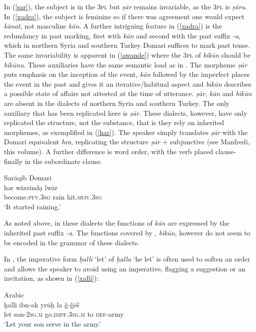 \documentclass[output=paper]{langsci/langscibook}
\begin{document}
In (\ref{sar}), the subject is in the 3\textsc{pl} but \textit{ṣār} remains invariable, as the \textsc{3pl} is \textit{ṣāru}. In (\ref{xadra}), the subject is feminine so if there was {agreement} one would expect \textit{kānat}, not masculine \textit{kān}. A further intriguing feature in (\ref{xadra}) is the redundancy in past marking, first with \textit{kān} and second with the past suffix \textit{{}-a}, which in northern Syria and southern Turkey Domari suffices to mark past {tense}. The same invariability is apparent in (\ref{awande}) where the \textsc{3pl} of \textit{bikūn} should be \textit{bikūnu}. These auxiliaries have the same semantic load as in . The morpheme \textit{ṣār} puts {emphasis} on the inception of the event, \textit{kān} followed by the imperfect places the event in the past and gives it an iterative/habitual aspect and \textit{bikūn} describes a possible state of affairs not attested at the time of utterance.  \textit{ṣār}, \textit{kān} and \textit{bikūn} are absent in the dialects of northern Syria and southern Turkey. The only auxiliary that has been replicated here is \textit{ṣār}. These dialects, however, have only replicated the structure, not the substance, that is they rely on inherited morphemes, as exemplified in (\ref{har}). The speaker simply translates  \textit{ṣār} with the Domari equivalent \textit{hra}, replicating the  structure \textit{ṣār} + subjunctive (see Manfredi, this volume). A further difference is {word order}, with the verb placed clause-finally in the subordinate clause. 

\ea \label{har}
{Sarāqib Domari}\\
\gll hər wārsīndạ lwār\\
     become.\textsc{pfv.3sg} rain hit.\textsc{sbjv.3sg}\\
\glt ‘It started raining.’
\z

As noted above, in these dialects the functions of  \textit{kān} are expressed by the inherited past suffix \textit{-a}. The functions covered by , \textit{bikūn}, however do not seem to be encoded in the grammar of these dialects.

In  , the imperative form \textit{ḫalli} ‘let’ of \textit{ḫalla} ‘he let’ is often used to soften an order and allows the speaker to avoid using an imperative, flagging a suggestion or an invitation, as shown in (\ref{xalli}):

\ea \label{xalli}
{ Arabic}\\
\gll ḫalli ibn-ak yrūḥ la \v{g}-\v{g}ēš\\
     let son-\textsc{2sg.m} go.\textsc{impf.3sg.m} to \textsc{def}{}-army\\
\glt ‘Let your son serve in the army.’
\z
\end{document}
